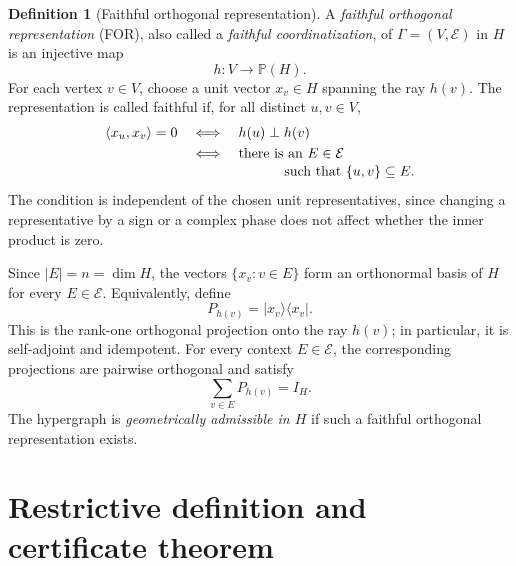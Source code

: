 \documentclass[
  twocolumn,
  aps,
  pra,
  floatfix,
  amsmath,amssymb,
  longbibliography
]{revtex4-2}
\theoremstyle{definition}
\newtheorem{definition}[theorem]{Definition}
\theoremstyle{remark}
\newcommand{\E}{\mathcal E}
\newcommand{\Pc}{\mathbb P}
\begin{document}
\begin{definition}[Faithful orthogonal representation]
A \emph{faithful orthogonal representation} (FOR), also called a
\emph{faithful coordinatization}, of $\Gamma=(V,\E)$ in $H$ is an injective
map
\[
 h:V\to\Pc(H).
\]
For each vertex $v\in V$, choose a unit vector $x_v\in H$ spanning the ray
$h(v)$.  The representation is called faithful if, for all distinct
$u,v\in V$,
\begin{equation}
 \begin{split}
  \langle x_u,x_v\rangle=0
  &\quad\Longleftrightarrow\quad h(u)\perp h(v)\\
  &\quad\Longleftrightarrow\quad
  \text{there is an }E\in\E\\[-2pt]
  &\hspace{2.7cm}\text{such that }\{u,v\}\subseteq E.
 \end{split}
 \label{eq:faithful}
\end{equation}
The condition is independent of the chosen unit representatives, since
changing a representative by a sign or a complex phase does not affect
whether the inner product is zero.

Since $|E|=n=\dim H$, the vectors
$\{x_v:v\in E\}$ form an orthonormal basis of $H$ for every $E\in\E$.
Equivalently, define
\[
 P_{h(v)}=|x_v\rangle\langle x_v|.
\]
This is the rank-one orthogonal projection onto the ray $h(v)$; in
particular, it is self-adjoint and idempotent.  For every context
$E\in\E$, the corresponding projections are pairwise orthogonal and satisfy
\begin{equation}
 \sum_{v\in E}P_{h(v)}=I_H.
 \label{eq:projector-context}
\end{equation}
The hypergraph is \emph{geometrically admissible in $H$} if such a faithful
orthogonal representation exists.
\end{definition}

\section{Restrictive definition and certificate theorem}
\label{sec:definition}
\end{document}
